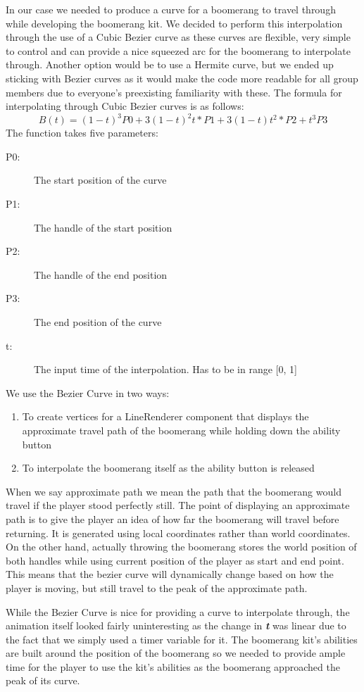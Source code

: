 In our case we needed to produce a curve for a boomerang to travel through while developing the boomerang kit. We decided to perform this interpolation through the use of a Cubic Bezier curve as these curves are flexible, very simple to control and can provide a nice squeezed arc for the boomerang to interpolate through. Another option would be to use a Hermite curve, but we ended up sticking with Bezier curves as it would make the code more readable for all group members due to everyone's preexisting familiarity with these. The formula for interpolating through Cubic Bezier curves is as follows:
$$
B(t) = (1 - t)^3 P0 + 3(1 - t)^2 t * P1 + 3(1 - t)t^2 * P2 + t^3 P3 
$$
The function takes five parameters:
\begin{description}
    \item[P0:] The start position of the curve
    \item[P1:] The handle of the start position
    \item[P2:] The handle of the end position
    \item[P3:] The end position of the curve
    \item[t:]  The input time of the interpolation. Has to be in range [0, 1]
\end{description}

We use the Bezier Curve in two ways:
\begin{enumerate}
    \item To create vertices for a LineRenderer component that displays the approximate travel path of the boomerang while holding down the ability button
    \item To interpolate the boomerang itself as the ability button is released
\end{enumerate}
When we say approximate path we mean the path that the boomerang would travel if the player stood perfectly still.
The point of displaying an approximate path is to give the player an idea of how far the boomerang will travel before returning. It is generated using local coordinates rather than world coordinates. On the other hand, actually throwing the boomerang stores the world position of both handles while using current position of the player as start and end point. This means that the bezier curve will dynamically change based on how the player is moving, but still travel to the peak of the approximate path.  

While the Bezier Curve is nice for providing a curve to interpolate through, the animation itself looked fairly uninteresting as the change in \textbf{\textit{t}} was linear due to the fact that we simply used a timer variable for it. The boomerang kit's abilities are built around the position of the boomerang so we needed to provide ample time for the player to use the kit's abilities as the boomerang approached the peak of its curve. 

